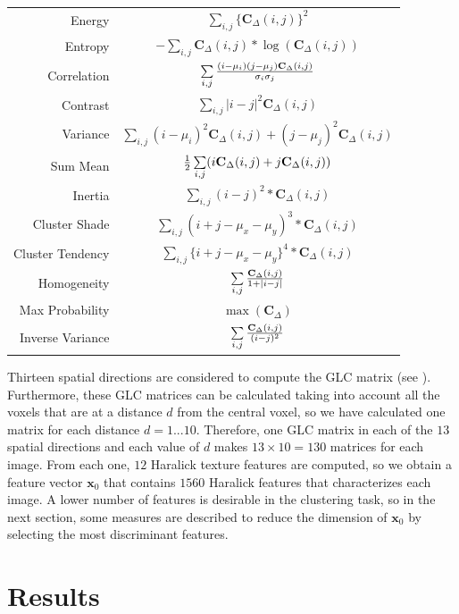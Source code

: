 \begin{center}
	\begin{tabular}{r|c}
		Energy & $\sum\limits_{i,j} \{ \mathbf{C}_{\Delta}(i,j)\}^2 $\\
		Entropy & $-\sum\limits_{i,j} \mathbf{C}_{\Delta}(i,j)*\log(\mathbf{C}_{\Delta}(i,j)) $\\
		Correlation & $\sum\limits_{i,j} {{(i-\mu_i)(j-\mu_j)\mathbf{C}_{\Delta}(i,j)}\over{\sigma_i\sigma_j}}$\\
		Contrast & $\sum\limits_{i,j} |i-j|^2 \mathbf{C}_{\Delta}(i,j)$ \\
		Variance & $\sum\limits_{i,j} (i-\mu_i)^2 \mathbf{C}_{\Delta}(i,j)+ (j-\mu_j)^2\mathbf{C}_{\Delta}(i,j)$\\
		Sum Mean & ${1 \over 2} \sum\limits_{i,j}(i\mathbf{C}_{\Delta}(i,j)+j\mathbf{C}_{\Delta}(i,j))$\\
		Inertia & $\sum\limits_{i,j}(i-j)^2*\mathbf{C}_{\Delta}(i,j)$\\
		Cluster Shade & $\sum\limits_{i,j}(i+j-\mu_x-\mu_y)^3 * \mathbf{C}_{\Delta}(i,j)$\\
		Cluster Tendency & $\sum\limits_{i,j}\{ i+j-\mu_x-\mu_y\}^4*\mathbf{C}_{\Delta}(i,j)$\\
		Homogeneity & $\sum\limits_{i,j} {\mathbf{C}_{\Delta}(i,j) \over 1+|i-j|}$\\
		Max Probability & $\max (\mathbf{C}_{\Delta})$\\
		Inverse Variance & $\sum\limits_{i,j} {\mathbf{C}_{\Delta}(i,j) \over (i-j)^2}$\\
	\end{tabular}
\end{center}

Thirteen spatial directions are considered to compute the GLC matrix (see  \cite{Philips2008}). Furthermore, these GLC matrices can be calculated taking into account all the voxels that are at a distance $d$ from the central voxel, so we have calculated one matrix for each distance $d=1...10$. Therefore, one GLC matrix in each of the $13$ spatial directions and each value of $d$ makes $13\times10=130$ matrices for each image. From each one, $12$ Haralick texture features are computed, so we obtain a feature vector $\mathbf{x}_0$ that contains $1560$ Haralick features that characterizes each image. A lower number of features is desirable in the clustering task, so in the next section, some measures are described to reduce the dimension of $\mathbf{x}_0$ by selecting the most discriminant features. 

\section{Results}
